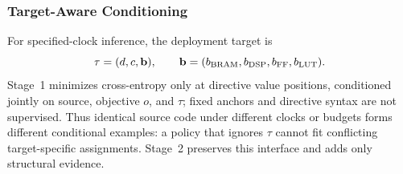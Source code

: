 \subsubsection{Target-Aware Conditioning}
\label{subsubsec:target-conditioning}

For specified-clock inference, the deployment target is
\[
\tau=(d,c,\mathbf b),\qquad
\mathbf b=(b_{\rm BRAM},b_{\rm DSP},b_{\rm FF},b_{\rm LUT}).
\]
Stage~1 minimizes cross-entropy only at directive value positions, conditioned jointly on source, objective $o$, and $\tau$; fixed anchors and directive syntax are not supervised. Thus identical source code under different clocks or budgets forms different conditional examples: a policy that ignores $\tau$ cannot fit conflicting target-specific assignments. Stage~2 preserves this interface and adds only structural evidence.


